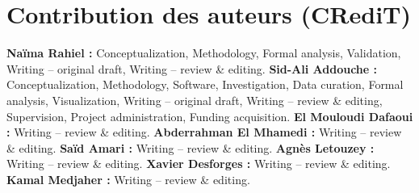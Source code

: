 \ifanonyme\else
\section*{Contribution des auteurs (CRediT)}

\textbf{Naïma Rahiel :} Conceptualization, Methodology, Formal analysis, Validation, Writing -- original draft, Writing -- review \& editing.
\textbf{Sid-Ali Addouche :} Conceptualization, Methodology, Software, Investigation, Data curation, Formal analysis, Visualization, Writing -- original draft, Writing -- review \& editing, Supervision, Project administration, Funding acquisition.
\textbf{El Mouloudi Dafaoui :} Writing -- review \& editing.
\textbf{Abderrahman El Mhamedi :} Writing -- review \& editing.
\textbf{Saïd Amari :} Writing -- review \& editing.
\textbf{Agnès Letouzey :} Writing -- review \& editing.
\textbf{Xavier Desforges :} Writing -- review \& editing.
\textbf{Kamal Medjaher :} Writing -- review \& editing.
\fi
